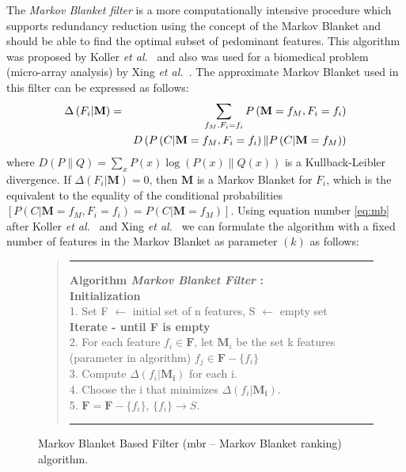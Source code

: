 \documentclass[a4paper,fleqn]{report}
\def\etal{{\em et al.\ }}
\begin{document}
The {\it Markov Blanket filter} is a more computationally intensive procedure 
which supports redundancy reduction using the concept of the Markov Blanket and should be able to find the optimal subset 
of pedominant features. 
This algorithm was proposed by Koller \etal \cite{Koller1996} and also was used for a biomedical problem (micro-array analysis) by Xing \etal \cite{Xing2001}.
The approximate Markov Blanket used in this filter can be expressed as follows:
\begin{eqnarray} \label{eq:mb}
\Delta \left( F_i | \mathbf{M} \right)&=&\sum_{f_{M},F_i=f_i} P \left( \mathbf{M} = f_{M}, F_i = f_i \right) \\ \nonumber
& \* & D \left( P \left( C | \mathbf{M} = f_{M}, F_i = f_i \right) \| P \left( C | \mathbf{M} = f_{M} \right) \right)
\end{eqnarray}
where $ D\left(P \| Q \right)= \sum_{x} P\left( x \right) \log \left( P\left(x \right) \| Q \left( x \right)\right) $ 
is a Kullback-Leibler divergence. If $\Delta \left( F_i | \mathbf{M} \right)=0$, then $\mathbf{M}$ is a Markov Blanket for $F_i$, 
which is the equivalent to the equality of the conditional probabilities $ \left[ P \left( C | \mathbf{M} = f_{M}, F_i = f_i \right) = P \left( C | \mathbf{M} = f_{M} \right) \right]$.
\newpage
Using equation number \ref{eq:mb} after Koller \etal \cite{Koller1996} and Xing \etal \cite{Xing2001} we can formulate the algorithm 
with a fixed number of features in the Markov Blanket as parameter $\left( k \right)$ as follows:\\

\begin{figure}[ht] \label{jbwd:quote:mbr} %
\vspace*{-0.4cm}
\centering
\begin{quote}
\hrule width 5.6 in
\vspace{0.2cm}
{\bf Algorithm {\it Markov Blanket Filter} :} \\
 {\bf Initialization} \\
  1. Set F $\leftarrow$ initial set of n features, S $\leftarrow$ empty set \\
 {\bf Iterate - until F is empty}\\
  2. For each feature $f_i \in \mathbf{F} $, let $\mathbf{M}_{i} $ be the set k features \\ 
                        (parameter in algorithm) $f_j \in \mathbf{F}-\{ f_i \} $\\
  3. Compute $ \Delta \left( f_i | \mathbf{M_i} \right) $ for each i.\\
  4. Choose the i that minimizes $ \Delta \left( f_i | \mathbf{M_i} \right) $.\\
  5. $\mathbf{F} = \mathbf{F} - \{f_i\} $, $\{f_i\} \rightarrow S $.\\
  \vspace{0.2cm}
  \hrule width 5.6 in
 \end{quote}
\caption{ Markov Blanket Based Filter (mbr -- Markov Blanket ranking) algorithm.}
\end{figure}
\end{document}
